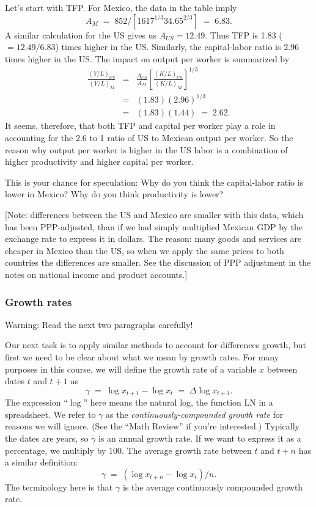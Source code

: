 \documentclass[letterpaper,12pt]{article}
\begin{document}
Let's start with TFP.
For Mexico, the data in the table imply
\[
    A_M \;=\; 852 / [ 1617^{1/3} 34.65^{2/3} ] \;=\; 6.83.
\]
A similar calculation for the US gives us $A_{US} = 12.49$.
Thus TFP is 1.83 ($= 12.49/6.83$) times higher in the US.
Similarly, the capital-labor ratio is 2.96 times higher in the US.
The impact on output per worker is summarized by
\begin{eqnarray*}
     \frac{(Y/L)_{US}}{(Y/L)_{M}}  &=&  \frac{A_{US}}{A_M}
                        \left[ \frac{(K/L)_{US}}{(K/L)_{M}} \right]^{1/3} \\
                         &=&   (1.83) (2.96)^{1/3} \\ %
                         &=&   (1.83) (1.44) \;=\; 2.62 . %
\end{eqnarray*}
It seems, therefore, that both TFP and capital per
worker play a role in accounting for the
2.6 to 1 ratio of US to Mexican output per worker.
So the reason why output per worker is higher in the US labor is a
combination of higher productivity and
higher capital per worker.

This is your chance for speculation:
Why do you think the capital-labor ratio is lower in Mexico?
Why do you think productivity is lower?  

[Note: differences between the US and Mexico are smaller with this data,
which has been PPP-adjusted, than if we had simply multiplied
Mexican GDP by the exchange rate to express it in dollars. The
reason:  many goods and services are cheaper in Mexico than the
US, so when we apply the same prices to both countries the
differences are smaller.
See the discussion of PPP adjustment in
the notes on national income and product accounts.]


\subsubsection*{Growth rates}

Warning:  Read the next two paragraphs carefully!

Our next task is to apply similar methods to
account for differences growth,
but first we
need to be clear about what we mean by growth rates. For many
purposes in this course, we will define the growth rate of a
variable $x$ between dates $t$ and $t+1$ as
\[
    \gamma \;=\; \log x_{t+1} - \log x_{t} \;=\; \Delta \log x_{t+1} .
\]
The expression ``$\log$'' here means the natural log,
the function LN in a spreadsheet.
We refer to $\gamma$ as the {\it continuously-compounded growth rate\/} 
for reasons we will ignore.
(See the ``Math Review'' if you're interested.)
Typically the dates are years, so $\gamma$ is an annual growth rate.
If we want to express it as a percentage, we multiply by 100.
The average growth rate between $t$ and $t+n$
has a similar definition:
\[
    \gamma \;=\; \left( \log x_{t+n} - \log x_{t} \right) / n  .
\]
The terminology here is that $\gamma$ is the average continuously compounded
growth rate.
\end{document}
